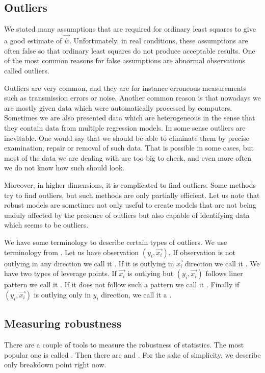 \subsection{Outliers}
We stated many assumptions that are required for ordinary least squares to give a good estimate of $\vec{\hat{w}}$. Unfortunately, in real conditions, these assumptions are often false so that ordinary least squares do not produce acceptable results. One of the most common reasons for false assumptions are abnormal observations called outliers.

Outliers are very common, and they are for instance erroneous measurements such as transmission errors or noise. Another common reason is that nowadays we are mostly given data which were automatically processed by computers. Sometimes we are also presented data which are heterogeneous in the sense that they contain data from multiple regression models. In some sense outliers are inevitable. One would say that we should be able to eliminate them by precise examination, repair or removal of such data. That is possible in some cases, but most of the data we are dealing with are too big to check, and even more often we do not know how such should look. 

Moreover, in higher dimensions, it is complicated to find outliers. Some methods try to find outliers, but such methods are only partially efficient. Let us note that robust models are sometimes not only useful to create models that are not being unduly affected by the presence of outliers but also capable of identifying data which seems to be outliers. 

We have some terminology to describe certain types of outliers. We use terminology from \cite{rouss:1990}. Let us have observation $(y_i, \vec{x_i})$. If observation is not outlying in any direction we call it  . If it is outlying in $\vec{x_i}$ direction we call it . We have two types of leverage points. If $\vec{x_i}$ is outlying but $(y_i, \vec{x_i})$ follows liner pattern we call it  . If it does not follow such a pattern we call it . Finally if $(y_i, \vec{x_i})$ is  outlying only in $y_i$  direction, we call it a .

\subsection{Measuring robustness}
There are a couple of tools to measure the robustness of statistics. The most popular one is called . Then there are  and . For the sake of simplicity, we describe only breakdown point right now. 

